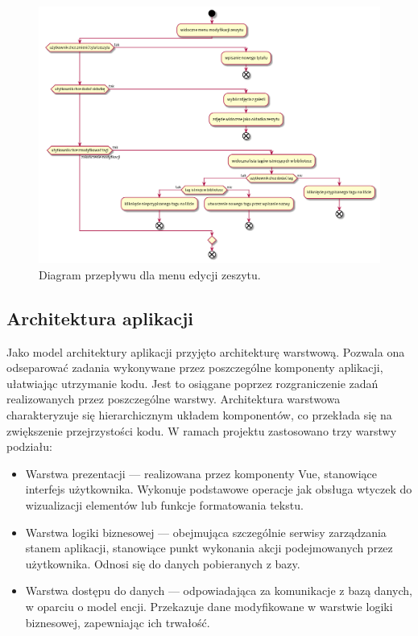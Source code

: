 \begin{figure}[H]
	\begin{center}
		\includegraphics[scale=0.4]{media/UserFlowBook.png}
	\end{center}
	\caption{Diagram przepływu dla menu edycji zeszytu.}
	\label{rys:flow-book-menu}
\end{figure}

\subsection{Architektura aplikacji}
Jako model architektury aplikacji przyjęto architekturę warstwową. Pozwala ona odseparować zadania wykonywane przez
poszczególne komponenty aplikacji, ułatwiając utrzymanie kodu. Jest to osiągane poprzez rozgraniczenie zadań
realizowanych przez poszczególne warstwy. Architektura warstwowa charakteryzuje się hierarchicznym układem komponentów,
co przekłada się na zwiększenie przejrzystości kodu. W ramach projektu zastosowano trzy warstwy podziału:

\begin{itemize}
	\item Warstwa prezentacji — realizowana przez komponenty Vue, stanowiące interfejs użytkownika. Wykonuje podstawowe operacje
	      jak obsługa wtyczek do wizualizacji elementów lub funkcje formatowania tekstu.
	\item Warstwa logiki biznesowej — obejmująca szczególnie serwisy zarządzania stanem aplikacji, stanowiące punkt wykonania
	      akcji podejmowanych przez użytkownika. Odnosi się do danych pobieranych z bazy.
	\item Warstwa dostępu do danych — odpowiadająca za komunikacje z bazą danych, w oparciu o model encji. Przekazuje
	      dane modyfikowane w warstwie logiki biznesowej, zapewniając ich trwałość.
\end{itemize}


